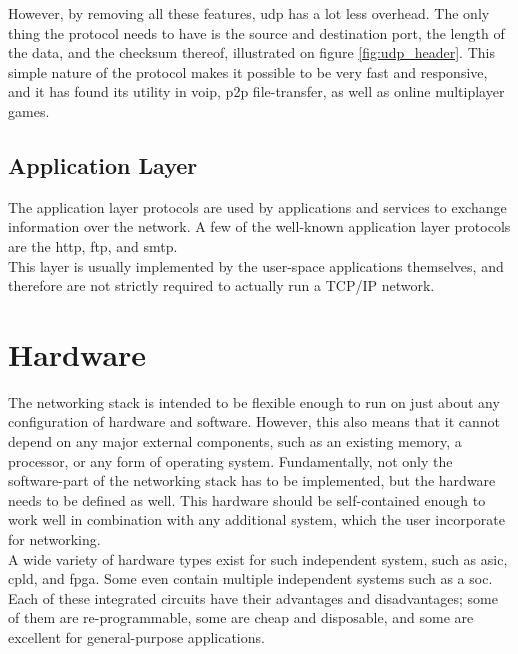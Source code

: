 However, by removing all these features, \gls{udp} has a lot less overhead. The
only thing the protocol needs to have is the source and destination port, the
length of the data, and the checksum thereof, illustrated on figure
\ref{fig:udp_header}. This simple nature of the protocol makes it possible to
be very fast and responsive, and it has found its utility in \gls{voip},
\gls{p2p} file-transfer, as well as online multiplayer games.

\subsection{Application Layer}
The application layer protocols are used by applications and services to
exchange information over the network. A few of the well-known application
layer protocols are the \gls{http}\cite{RFC1945},
\gls{ftp}\cite{RFC0114}, and \gls{smtp}\cite{RFC0788}.\\
This layer is usually implemented by the user-space applications themselves, and
therefore are not strictly required to actually run a TCP/IP network.



\section{Hardware}
The networking stack is intended to be flexible enough to run on just about any
configuration of hardware and software. However, this also means that it cannot
depend on any major external components, such as an existing memory, a processor,
or any form of operating system. Fundamentally, not only the software-part of the
networking stack has to be implemented, but the hardware needs to be defined
as well. This hardware should be self-contained enough to work well in combination
with any additional system, which the user incorporate for networking.\\
A wide variety of hardware types exist for such independent system, such as
\gls{asic}, \gls{cpld}, and \gls{fpga}. Some even contain multiple independent systems
such as a \gls{soc}.
Each of these integrated circuits have their advantages and disadvantages; some
of them are re-programmable, some are cheap and disposable, and some are excellent
for general-purpose applications.\\


